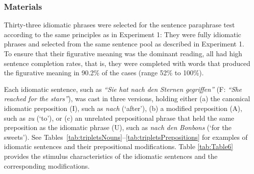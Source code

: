 \documentclass[output=paper]{langsci/langscibook}
\begin{document}
\subsubsection{Materials}
Thirty-three idiomatic phrases were selected for the sentence paraphrase test according to the same principles as in Experiment 1: They were fully idiomatic phrases and selected from the same sentence pool as described in Experiment 1.  To ensure that their figurative meaning was the dominant reading, all had high sentence completion rates, that is, they were completed with words that produced the figurative meaning in 90.2\% of the cases (range 52\% to 100\%).

Each idiomatic sentence, such as \textit{``Sie hat nach den Sternen gegriffen''} (F: \textit{``She reached for the stars''}), was cast in three versions, holding either (a) the canonical idiomatic preposition (I), such as \textit{nach} (‘after’), (b) a modified preposition (A), such as \textit{zu} (‘to’), or (c) an unrelated prepositional phrase that held the same preposition as the idiomatic phrase (U), such as \textit{nach den Bonbons} (‘for the sweets’). See Tables~\ref{tab:tripletsNouns}--\ref{tab:tripletsPrepositions} for examples of idiomatic sentences and their prepositional modifications. Table \ref{tab:Table6} provides the stimulus characteristics of the idiomatic sentences and the corresponding modifications.

\begin{table}
\caption{Idiomatic sentences and stimulus characteristics of the idiomatic and modified preposition, and unrelated prepositional phrase in Experiment 3. \textit{Note.} N = number of items, Lemma = mean lemma frequency per one million, taken from CELEX \citep{baayen:1993}, Closure = mean sentence completion in \%.\label{tab:Table6}}
\end{table}
\end{document}
